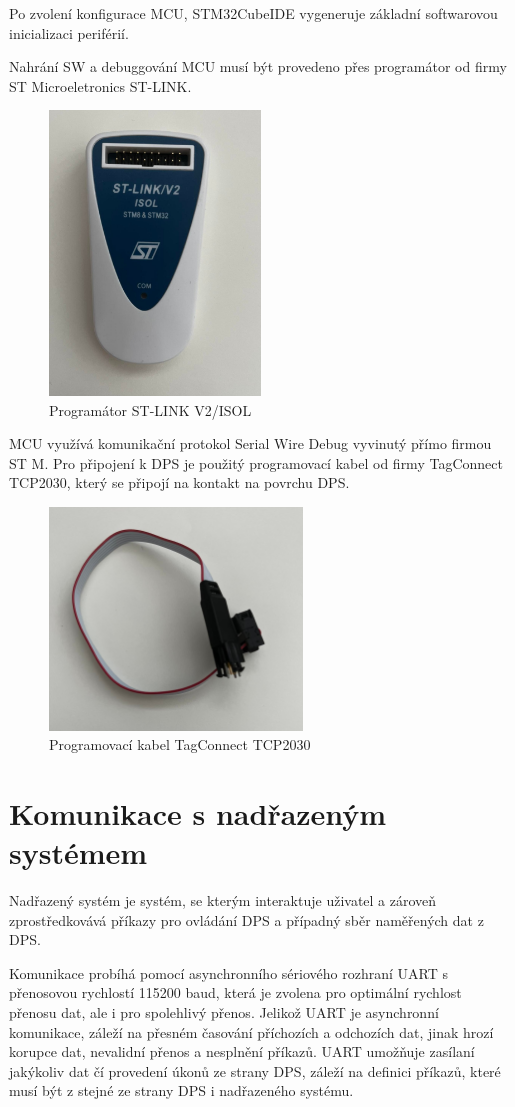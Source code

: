 Po zvolení konfigurace MCU, STM32CubeIDE vygeneruje základní softwarovou inicializaci periférií.
\par
Nahrání SW a debuggování MCU musí být provedeno přes programátor od firmy ST Microeletronics ST-LINK.
\begin{figure}[H]
    \caption{Programátor ST-LINK V2/ISOL}
    \includegraphics[width=0.5\textwidth]{pictures/stlink.jpg}
\end{figure}
MCU využívá komunikační protokol Serial Wire Debug vyvinutý přímo firmou ST M. Pro připojení k DPS je použitý programovací kabel od firmy TagConnect TCP2030, který se připojí na kontakt na povrchu DPS.
\begin{figure}[H]
    \caption{Programovací kabel TagConnect TCP2030}
    \includegraphics[width=0.6\textwidth]{pictures/tcp2030.jpg}
\end{figure}
\section{Komunikace s nadřazeným systémem}
Nadřazený systém je systém, se kterým interaktuje uživatel a zároveň zprostředkovává příkazy pro ovládání DPS a případný sběr naměřených dat z DPS.
\par
Komunikace probíhá pomocí asynchronního sériového rozhraní UART s přenosovou rychlostí 115200 baud, která je zvolena pro optimální rychlost přenosu dat, ale i pro spolehlivý přenos.
Jelikož UART je asynchronní komunikace, záleží na přesném časování příchozích a odchozích dat, jinak hrozí korupce dat, nevalidní přenos a nesplnění příkazů.
UART umožňuje zasílaní jakýkoliv dat čí provedení úkonů ze strany DPS, záleží na definici příkazů, které musí být z stejné ze strany DPS i nadřazeného systému.
